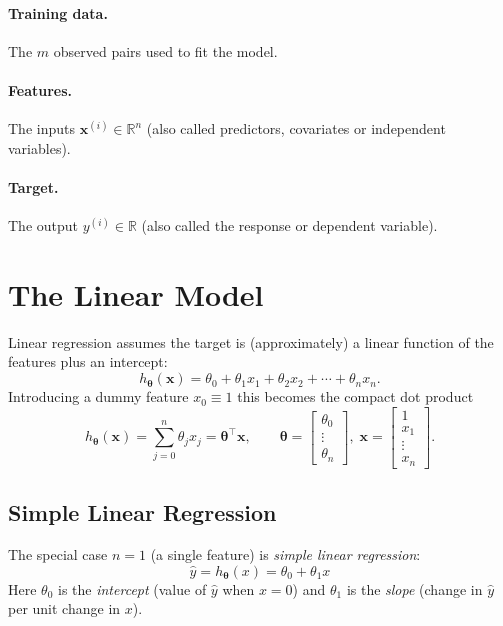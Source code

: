 \documentclass[11pt,a4paper]{report}
\theoremstyle{definition}
\theoremstyle{plain}
\theoremstyle{remark}
\newcommand{\R}{\mathbb{R}}
\newcommand{\vx}{\mathbf{x}}
\newcommand{\vw}{\bm{\theta}}          %
\newcommand{\htheta}{h_{\bm{\theta}}}
\begin{document}
	\paragraph{Training data.} The $m$ observed pairs used to fit the model.
	\paragraph{Features.} The inputs $\vx^{(i)}\in\R^{n}$ (also called predictors,
	covariates or independent variables).
	\paragraph{Target.} The output $y^{(i)}\in\R$ (also called the response or
	dependent variable).
	
	\section{The Linear Model}
	Linear regression assumes the target is (approximately) a linear function of
	the features plus an intercept:
	\begin{equation}
		\htheta(\vx)=\theta_0+\theta_1 x_1+\theta_2 x_2+\cdots+\theta_n x_n .
		\label{eq:multimodel}
	\end{equation}
	Introducing a dummy feature $x_0\equiv 1$ this becomes the compact dot product
	\begin{equation}
		\htheta(\vx)=\sum_{j=0}^{n}\theta_j x_j=\vw^{\!\top}\vx ,
		\qquad \vw=\begin{bmatrix}\theta_0\\\vdots\\\theta_n\end{bmatrix},\;
		\vx=\begin{bmatrix}1\\x_1\\\vdots\\x_n\end{bmatrix}.
		\label{eq:dotmodel}
	\end{equation}
	
	\subsection{Simple Linear Regression}
	The special case $n=1$ (a single feature) is \emph{simple linear regression}:
	\begin{equation}
		\boxed{\;\hat{y}=\htheta(x)=\theta_0+\theta_1 x\;}
		\label{eq:simplemodel}
	\end{equation}
	Here $\theta_0$ is the \emph{intercept} (value of $\hat y$ when $x=0$) and
	$\theta_1$ is the \emph{slope} (change in $\hat y$ per unit change in $x$).
	
\end{document}
